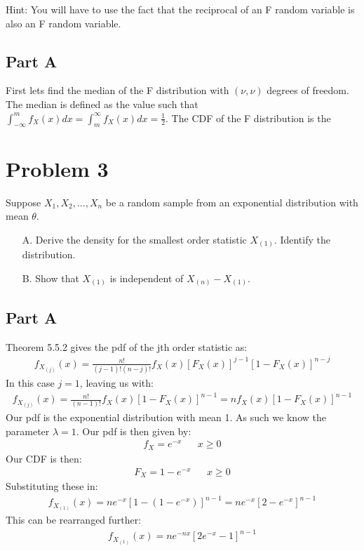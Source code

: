 \documentclass{article}
\begin{document}
Hint: You will have to use the fact that the reciprocal of an F random variable is also an F random
variable.

\subsection*{Part A}
First lets find the median of the F distribution with $(\nu, \nu)$ degrees of freedom. The median is defined as the value such that $\int_{-\infty}^{m} f_X(x) dx = \int_{m}^{\infty} f_X(x) dx = \frac{1}{2}$. The CDF of the F distribution is the 

    
\clearpage
\section*{Problem 3}
Suppose $X_1,X_2,...,X_n$ be a random sample from an exponential distribution with mean $\theta$.
\begin{enumerate}
\item[A.] Derive the density for the smallest order statistic $X_{(1)}$. Identify the distribution.
\item[B.] Show that $X_{(1)}$ is independent of $X_{(n)}-X_{(1)}$.
\end{enumerate}
\subsection*{Part A}
Theorem 5.5.2 gives the pdf of the jth order statistic as:
\begin{align*}
f_{X_{(j)}}(x) = \frac{n!}{(j-1)!(n-j)!} f_X(x) [F_X(x)]^{j-1} [1-F_X(x)]^{n-j}
\end{align*}
In this case $j=1$, leaving us with:
\begin{align*}
f_{X_{(j)}}(x) = \frac{n!}{(n-1)!} f_X(x) [1-F_X(x)]^{n-1} = n f_X(x) [1-F_X(x)]^{n-1}
\end{align*}
Our pdf is the exponential distribution with mean 1. As such we know the parameter $\lambda=1$. Our pdf is then given by:\begin{align*}
f_X = e^{-x} && x \geq 0
\end{align*}
Our CDF is then:
\begin{align*}
F_X = 1-e^{-x} && x \geq 0
\end{align*}
Substituting these in:
\begin{align*}
f_{X_{(1)}}(x) = n e^{-x} [1-(1-e^{-x})]^{n-1} = n e^{-x} [2-e^{-x}]^{n-1}
\end{align*}
This can be rearranged further:
\begin{align*}
f_{X_{(1)}}(x) = n e^{-nx} [2e^{-x}-1]^{n-1}
\end{align*}
\end{document}
